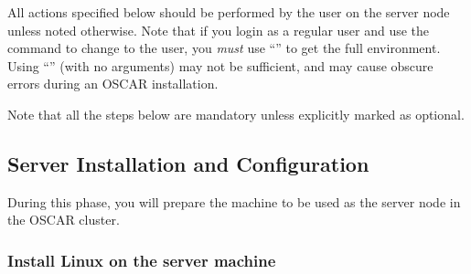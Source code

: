 %
% 
%
%
%

\label{sec:detail}

All actions specified below should be performed by the 
user on the server node unless noted otherwise.  Note that if you
login as a regular user and use the  command to change to the
 user, you {\em must} use ``'' to get the full
 environment.  Using ``'' (with no arguments) may
not be sufficient, and may cause obscure errors during an OSCAR
installation.

Note that all the steps below are mandatory unless explicitly marked
as optional.



\subsection{Server Installation and Configuration}
\label{det:serverinstall}
  
During this phase, you will prepare the machine to be used as the
server node in the OSCAR cluster.


\subsubsection{Install Linux on the server machine} 
\label{det:serverosinstall}

